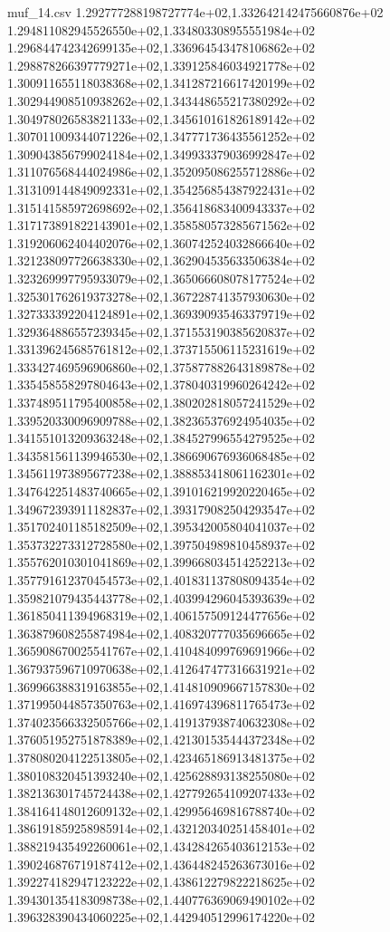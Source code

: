 \begin{filecontents*}{muf_14.csv}
1.292777288198727774e+02,1.332642142475660876e+02
1.294811082945526550e+02,1.334803308955551984e+02
1.296844742342699135e+02,1.336964543478106862e+02
1.298878266397779271e+02,1.339125846034921778e+02
1.300911655118038368e+02,1.341287216617420199e+02
1.302944908510938262e+02,1.343448655217380292e+02
1.304978026583821133e+02,1.345610161826189142e+02
1.307011009344071226e+02,1.347771736435561252e+02
1.309043856799024184e+02,1.349933379036992847e+02
1.311076568444024986e+02,1.352095086255712886e+02
1.313109144849092331e+02,1.354256854387922431e+02
1.315141585972698692e+02,1.356418683400943337e+02
1.317173891822143901e+02,1.358580573285671562e+02
1.319206062404402076e+02,1.360742524032866640e+02
1.321238097726638330e+02,1.362904535633506384e+02
1.323269997795933079e+02,1.365066608078177524e+02
1.325301762619373278e+02,1.367228741357930630e+02
1.327333392204124891e+02,1.369390935463379719e+02
1.329364886557239345e+02,1.371553190385620837e+02
1.331396245685761812e+02,1.373715506115231619e+02
1.333427469596906860e+02,1.375877882643189878e+02
1.335458558297804643e+02,1.378040319960264242e+02
1.337489511795400858e+02,1.380202818057241529e+02
1.339520330096909788e+02,1.382365376924954035e+02
1.341551013209363248e+02,1.384527996554279525e+02
1.343581561139946530e+02,1.386690676936068485e+02
1.345611973895677238e+02,1.388853418061162301e+02
1.347642251483740665e+02,1.391016219920220465e+02
1.349672393911182837e+02,1.393179082504293547e+02
1.351702401185182509e+02,1.395342005804041037e+02
1.353732273312728580e+02,1.397504989810458937e+02
1.355762010301041869e+02,1.399668034514252213e+02
1.357791612370454573e+02,1.401831137808094354e+02
1.359821079435443778e+02,1.403994296045393639e+02
1.361850411394968319e+02,1.406157509124477656e+02
1.363879608255874984e+02,1.408320777035696665e+02
1.365908670025541767e+02,1.410484099769691966e+02
1.367937596710970638e+02,1.412647477316631921e+02
1.369966388319163855e+02,1.414810909667157830e+02
1.371995044857350763e+02,1.416974396811765473e+02
1.374023566332505766e+02,1.419137938740632308e+02
1.376051952751878389e+02,1.421301535444372348e+02
1.378080204122513805e+02,1.423465186913481375e+02
1.380108320451393240e+02,1.425628893138255080e+02
1.382136301745724438e+02,1.427792654109207433e+02
1.384164148012609132e+02,1.429956469816788740e+02
1.386191859258985914e+02,1.432120340251458401e+02
1.388219435492260061e+02,1.434284265403612153e+02
1.390246876719187412e+02,1.436448245263673016e+02
1.392274182947123222e+02,1.438612279822218625e+02
1.394301354183098738e+02,1.440776369069490102e+02
1.396328390434060225e+02,1.442940512996174220e+02

\end{filecontents*}
